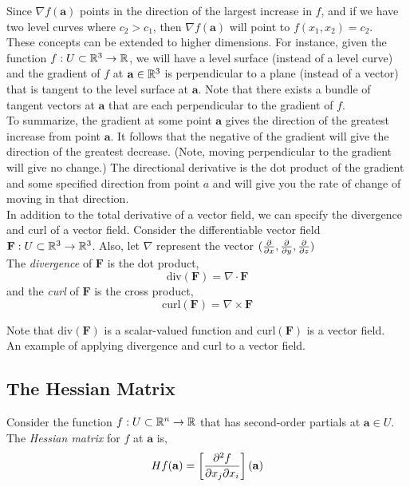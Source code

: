 \documentclass[12pt]{article}
\begin{document}
 Since $\nabla f(\mathbf{a})$ points in the direction of the largest increase in $f$, and if we have two level curves where $c_2>c_1$, then $\nabla f(\mathbf{a})$ will point to $f(x_1,x_2) = c_2$. \\

 These concepts can be extended to higher dimensions. For instance, given the function $f:U\subset\mathbb{R}^3\rightarrow\mathbb{R}$, we will have a level surface (instead of a level curve) and the gradient of $f$ at $\mathbf{a}\in\mathbb{R}^3$ is perpendicular to a plane (instead of a vector) that is tangent to the level surface at $\mathbf{a}$. Note that there exists a bundle of tangent vectors at $\mathbf{a}$ that are each perpendicular to the gradient of $f$. \\

 To summarize, the gradient at some point $\mathbf{a}$ gives the direction of the greatest increase from point $\mathbf{a}$. It follows that the negative of the gradient will give the direction of the greatest decrease. (Note, moving perpendicular to the gradient will give no change.) The directional derivative is the dot product of the gradient and some specified direction from point $a$ and will give you the rate of change of moving in that direction. \\

 In addition to the total derivative of a vector field, we can specify the divergence and curl of a vector field. Consider the differentiable vector field $\mathbf{F}:U\subset\mathbb{R}^3\rightarrow\mathbb{R}^3$. Also, let $\nabla$ represent the vector $(\frac{\partial }{\partial x},\frac{\partial }{\partial y},\frac{\partial }{\partial z})$ \\

 The \emph{divergence} of $\mathbf{F}$ is the dot product,
\[
\mbox{div}(\mathbf{F}) = \nabla\cdot\mathbf{F}
\]
and the \emph{curl} of $\mathbf{F}$ is the cross product,
\[
\mbox{curl}(\mathbf{F}) = \nabla\times\mathbf{F}
\]

 Note that $\mbox{div}(\mathbf{F})$ is a scalar-valued function and $\mbox{curl}(\mathbf{F})$ is a vector field. \\

 {\color{red} An example of applying divergence and curl to a vector field.} \\

\subsection{The Hessian Matrix}

 Consider the function $f:U\subset\mathbb{R}^n\rightarrow\mathbb{R}$ that has second-order partials at $\mathbf{a}\in U$. The \emph{Hessian matrix} for $f$ at $\mathbf{a}$ is,
\[
Hf(\mathbf{a}) = \left[ \frac{\partial ^2f}{\partial x_j\partial x_i} \right] (\mathbf{a})
\]
\end{document}
